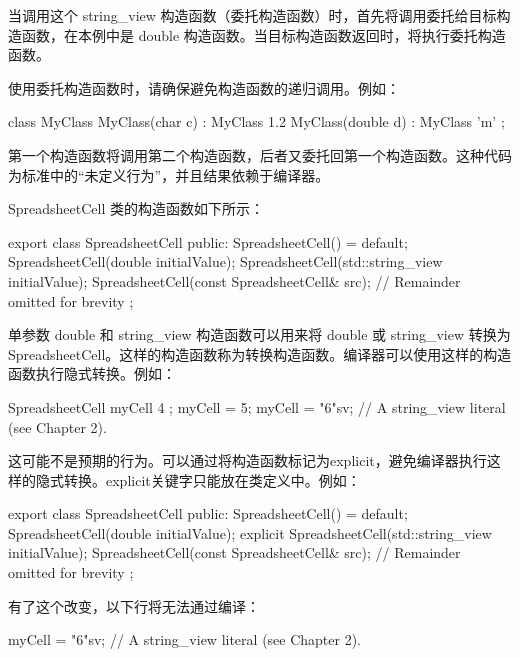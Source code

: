 当调用这个 string\_view 构造函数（委托构造函数）时，首先将调用委托给目标构造函数，在本例中是 double 构造函数。当目标构造函数返回时，将执行委托构造函数。

使用委托构造函数时，请确保避免构造函数的递归调用。例如：

\begin{cpp}
class MyClass
{
    MyClass(char c) : MyClass { 1.2 } { }
    MyClass(double d) : MyClass { 'm' } { }
};
\end{cpp}

第一个构造函数将调用第二个构造函数，后者又委托回第一个构造函数。这种代码为标准中的“未定义行为”，并且结果依赖于编译器。


SpreadsheetCell 类的构造函数如下所示：

\begin{cpp}
export class SpreadsheetCell
{
    public:
        SpreadsheetCell() = default;
        SpreadsheetCell(double initialValue);
        SpreadsheetCell(std::string_view initialValue);
        SpreadsheetCell(const SpreadsheetCell& src);
    // Remainder omitted for brevity
};
\end{cpp}

单参数 double 和 string\_view 构造函数可以用来将 double 或 string\_view 转换为 SpreadsheetCell。这样的构造函数称为转换构造函数。编译器可以使用这样的构造函数执行隐式转换。例如：

\begin{cpp}
SpreadsheetCell myCell { 4 };
myCell = 5;
myCell = "6"sv; // A string_view literal (see Chapter 2).
\end{cpp}

这可能不是预期的行为。可以通过将构造函数标记为explicit，避免编译器执行这样的隐式转换。explicit关键字只能放在类定义中。例如：

\begin{cpp}
export class SpreadsheetCell
{
    public:
        SpreadsheetCell() = default;
        SpreadsheetCell(double initialValue);
        explicit SpreadsheetCell(std::string_view initialValue);
        SpreadsheetCell(const SpreadsheetCell& src);
    // Remainder omitted for brevity
};
\end{cpp}

有了这个改变，以下行将无法通过编译：

\begin{cpp}
myCell = "6"sv; // A string_view literal (see Chapter 2).
\end{cpp}

